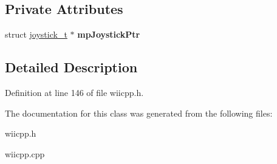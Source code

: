 \subsection*{\-Private \-Attributes}
\begin{DoxyCompactItemize}
\item 
\hypertarget{class_c_joystick_a3bb1adef8ad30963f24979bd6ff1a3b7}{struct \hyperlink{structjoystick__t}{joystick\-\_\-t} $\ast$ {\bfseries mp\-Joystick\-Ptr}}\label{class_c_joystick_a3bb1adef8ad30963f24979bd6ff1a3b7}

\end{DoxyCompactItemize}


\subsection{\-Detailed \-Description}


\-Definition at line 146 of file wiicpp.\-h.



\-The documentation for this class was generated from the following files\-:\begin{DoxyCompactItemize}
\item 
wiicpp.\-h\item 
wiicpp.\-cpp\end{DoxyCompactItemize}
